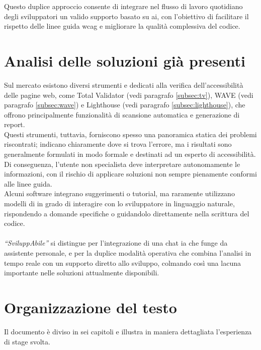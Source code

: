 Questo duplice approccio consente di integrare nel flusso di lavoro quotidiano degli sviluppatori un valido supporto basato su \acrshort{ai}, con l’obiettivo di facilitare il rispetto delle linee guida \acrshort{wcag} e migliorare la qualità complessiva del codice.

\section{Analisi delle soluzioni già presenti}
\noindent Sul mercato esistono diversi strumenti e  dedicati alla verifica dell’accessibilità delle pagine web, come Total Validator (vedi paragrafo \ref{subsec:tv}), WAVE (vedi paragrafo \ref{subsec:wave}) e Lighthouse (vedi paragrafo \ref{subsec:lighthouse}), che offrono principalmente funzionalità di scansione automatica e generazione di report.\\ 
Questi strumenti, tuttavia, forniscono spesso una panoramica statica dei problemi riscontrati; indicano chiaramente dove si trova l’errore, ma i risultati sono generalmente formulati in modo formale e destinati ad un esperto di accessibilità. Di conseguenza, l’utente non specialista deve interpretare autonomamente le informazioni, con il rischio di applicare soluzioni non sempre pienamente conformi alle linee guida.\\ 
Alcuni software integrano suggerimenti o tutorial, ma raramente utilizzano modelli di  in grado di interagire con lo sviluppatore in linguaggio naturale, rispondendo a domande specifiche o guidandolo direttamente nella scrittura del codice. \\
\\
\textit{“SviluppAbile”} si distingue per l’integrazione di una chat \acrshort{ia} che funge da assistente personale, e per la duplice modalità operativa che combina l’analisi in tempo reale con un supporto diretto allo sviluppo, colmando così una lacuna importante nelle soluzioni attualmente disponibili.

\section{Organizzazione del testo}
\noindent Il documento è diviso in sei capitoli e illustra in maniera dettagliata l’esperienza di stage svolta.

